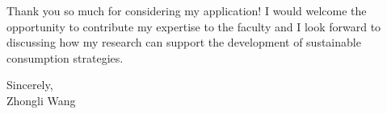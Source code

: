 \documentclass[11pt]{article}
\begin{document}
Thank you so much for considering my application! I would welcome the opportunity to contribute my expertise to the faculty and I look forward to discussing how my research can support the development of sustainable consumption strategies.


\noindent Sincerely,\\[10mm]
\noindent Zhongli Wang
\end{document}
